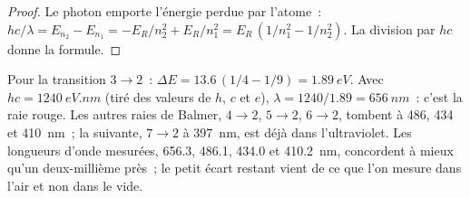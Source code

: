 \begin{proof}
Le photon emporte l'énergie perdue par l'atome~:
$hc/\lambda = E_{n_2} - E_{n_1} = -E_R/n_2^2 + E_R/n_1^2
= E_R\,(1/n_1^2 - 1/n_2^2)$. La division par $hc$ donne la formule.
\end{proof}

\begin{example}\label{ex:b1:quantum-numbers:halpha}
Pour la transition $3 \to 2$~: $\Delta E = 13.6\,(1/4 - 1/9) =
\qty{1.89}{eV}$. Avec $hc = \qty{1240}{eV.nm}$ (tiré des valeurs de $h$,
$c$ et $e$), $\lambda = 1240/1.89 = \qty{656}{nm}$~: c'est la raie rouge.
Les autres raies de Balmer, $4 \to 2$, $5 \to 2$, $6 \to 2$, tombent à
486, 434 et \qty{410}{nm}~; la suivante, $7 \to 2$ à \qty{397}{nm}, est
déjà dans l'ultraviolet. Les longueurs d'onde mesurées, 656.3, 486.1,
434.0 et \qty{410.2}{nm}, concordent à mieux qu'un deux-millième près~;
le petit écart restant vient de ce que l'on mesure dans l'air et non
dans le vide.
\end{example}

